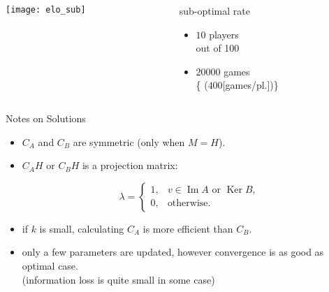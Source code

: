 \documentclass[fleqn,aspectratio=1610]{beamer}
\begin{document}
\begin{frame}[label={sec:org267703b}]{}
\begin{columns}
\begin{column}{0.65\columnwidth}
\begin{center}
  \texttt{[image: elo\_sub]}%
\end{center}
\end{column}
\begin{column}{0.35\columnwidth}
sub-optimal rate
\begin{itemize}
\item \(10\) players\\[0pt]
out of 100
\item \(20000\) games\\[0pt]
\{\small
(\(400\)[games/pl.])\}
\end{itemize}
\end{column}
\end{columns}
\end{frame}

\begin{frame}[label={sec:org710fec6}]{Notes on Solutions}
\begin{itemize}
\item \(C_{A}\) and \(C_{B}\) are symmetric (only when \(M=H\)).
\item \(C_{A}H\) or \(C_{B}H\) is a projection matrix:

\begin{equation}
  \lambda
  =
  \begin{cases}
    1,& v\in\operatorname{Im}A\text{ or }\operatorname{Ker}B,\\
    0,& \text{otherwise}.
  \end{cases}
\end{equation}
\item if \(k\) is small, calculating \(C_{A}\) is more efficient than \(C_{B}\).
\item only a few parameters are updated, however convergence is as
good as optimal case.\\[0pt]
(information loss is quite small in some case)
\end{itemize}
\end{frame}
\end{document}
